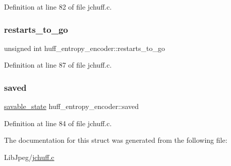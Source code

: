 Definition at line 82 of file jchuff.\+c.

\mbox{\label{structhuff__entropy__encoder_a6c999079a14022f2610081d420c36513}} 
\subsubsection{\texorpdfstring{restarts\_to\_go}{restarts\_to\_go}}
{\footnotesize\ttfamily unsigned int huff\+\_\+entropy\+\_\+encoder\+::restarts\+\_\+to\+\_\+go}



Definition at line 87 of file jchuff.\+c.

\mbox{\label{structhuff__entropy__encoder_ac27e136d5c3baca34bafde2053d91ad0}} 
\subsubsection{\texorpdfstring{saved}{saved}}
{\footnotesize\ttfamily \mbox{\hyperlink{structsavable__state}{savable\+\_\+state}} huff\+\_\+entropy\+\_\+encoder\+::saved}



Definition at line 84 of file jchuff.\+c.



The documentation for this struct was generated from the following file\+:\begin{DoxyCompactItemize}
\item 
Lib\+Jpeg/\mbox{\hyperlink{jchuff_8c}{jchuff.\+c}}\end{DoxyCompactItemize}
